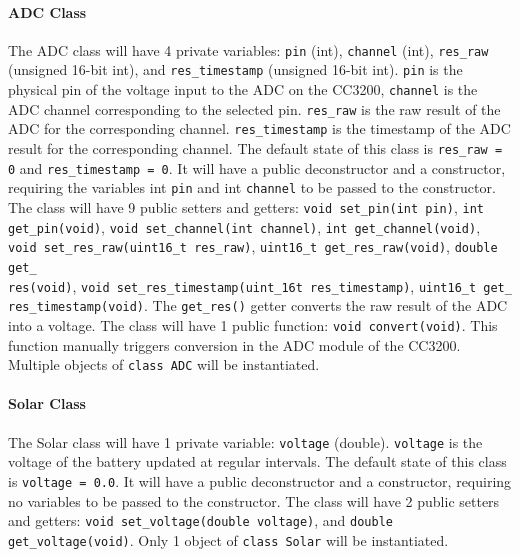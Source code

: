 \paragraph{ADC Class}
The ADC class will have 4 private variables: \texttt{pin} (int), 
\texttt{channel} (int), \texttt{res\_raw} (unsigned 16-bit int), and
\texttt{res\_timestamp} (unsigned 16-bit int). \texttt{pin} is the physical
pin of the voltage input to the ADC on the CC3200, \texttt{channel} is the
ADC channel corresponding to the selected pin. \texttt{res\_raw} is the raw
result of the ADC for the corresponding channel. \texttt{res\_timestamp} is the
timestamp of the ADC result for the corresponding channel. The default state
of this class is \texttt{res\_raw = 0} and \texttt{res\_timestamp = 0}. It will
have a public deconstructor and a constructor, requiring the variables int
\texttt{pin} and int \texttt{channel} to be passed to the constructor.
The class will have 9 public setters and getters:
\texttt{void set\_pin(int pin)}, \texttt{int get\_pin(void)},
\texttt{void set\_channel(int channel)}, \texttt{int get\_channel(void)},
\texttt{void set\_res\_raw(uint16\_t res\_raw)},
\texttt{uint16\_t get\_res\_raw(void)},
\texttt{double get\_\\
res(void)},
\texttt{void set\_res\_timestamp(uint\_16t res\_timestamp)},
\texttt{uint16\_t get\_\\
res\_timestamp(void)}. The \texttt{get\_res()} getter
converts the raw result of the ADC into a voltage. The class will have 1 public
function: \texttt{void convert(void)}. This function manually triggers
conversion in the ADC module of the CC3200. Multiple objects of
\texttt{class ADC} will be instantiated.

\paragraph{Solar Class}
The Solar class will have 1 private variable: \texttt{voltage} (double). \texttt{voltage} is the voltage of the battery updated at
regular intervals. The default state of this class is \texttt{voltage = 0.0}. It will have a public
deconstructor and a constructor, requiring no variables to be passed to the
constructor. The class will have 2 public setters and getters:
\texttt{void set\_voltage(double voltage)}, and
\texttt{double get\_voltage(void)}. Only 
1 object of \texttt{class Solar} will be instantiated.

